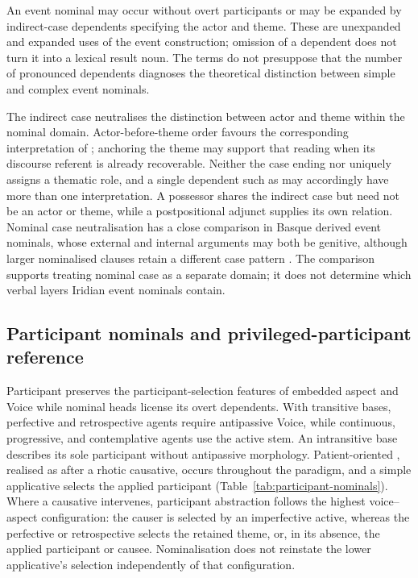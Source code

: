 An event nominal may occur without overt participants or may be expanded by
indirect-case dependents specifying the actor and theme. These are unexpanded
and expanded uses of the event construction; omission of a dependent does not
turn it into a lexical result noun. The terms do not presuppose that the number
of pronounced dependents diagnoses the theoretical distinction between simple
and complex event nominals.

\pex
\a {}  
\a {}  
\a {} 
\a {} 
\xe

The indirect case neutralises the distinction between actor and theme within
the nominal domain. Actor-before-theme order favours the corresponding
interpretation of ; anchoring the theme may support
that reading when its discourse referent is already recoverable. Neither the
case ending nor  uniquely assigns a thematic role, and a single
dependent such as  may accordingly have more than one
interpretation. A possessor shares the indirect case but need not be an actor
or theme, while a postpositional adjunct supplies its own relation. Nominal
case neutralisation has a close comparison in Basque derived event nominals,
whose external and internal arguments may both be genitive, although larger
nominalised clauses retain a different case pattern \cite{artiagoitia2023}.
The comparison supports treating nominal case as a separate domain; it does
not determine which verbal layers Iridian event nominals contain.

\subsection{Participant nominals and privileged-participant reference}
\label{sec:nm-derived-participant}

Participant  preserves the participant-selection features of
embedded aspect and Voice while nominal heads license its overt dependents.
With transitive bases, perfective and retrospective agents require antipassive
Voice, while continuous, progressive, and contemplative agents use the active
stem. An intransitive base describes its sole participant without antipassive
morphology. Patient-oriented
, realised as  after a rhotic causative, occurs
throughout the paradigm, and a simple applicative selects the applied participant
(Table~\ref{tab:participant-nominals}). Where a
causative intervenes, participant abstraction follows the highest
voice--aspect configuration: the causer is selected by an imperfective active,
whereas the perfective or retrospective selects the retained theme, or, in
its absence, the applied participant or causee. Nominalisation does not
reinstate the lower applicative's selection independently of that configuration.

